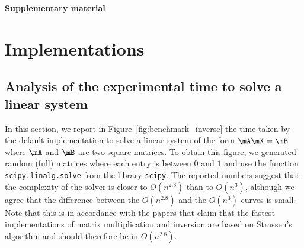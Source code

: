 \begin{subappendices}

\begin{center}
    \bfseries \Large Supplementary material
\end{center}

\section{Implementations}
\label{apx:implementation}

\subsection{Analysis of the experimental time to solve a linear system}
\label{apx:inversion}

In this section, we report in Figure~\ref{fig:benchmark_inverse} the time taken by the default implementation to solve a linear system of the form $\mA\mX=\mB$ where $\mA$ and $\mB$ are two square matrices. To obtain this figure, we generated random (full) matrices where each entry is between $0$ and $1$ and use the function  \texttt{scipy.linalg.solve} from the library \texttt{scipy}. The reported numbers suggest that the complexity of the solver is closer to $O(n^{2.8})$ than to $O(n^3)$, although we agree that the difference between the $O(n^{2.8})$ and the $O(n^3)$ curves is small. Note that this is in accordance with the papers \cite{huang2016strassen,huang2018practical} that claim that the fastest implementations of matrix multiplication and inversion are based on Strassen's algorithm and should therefore be in $O(n^{2.8})$. 


\end{subappendices}
